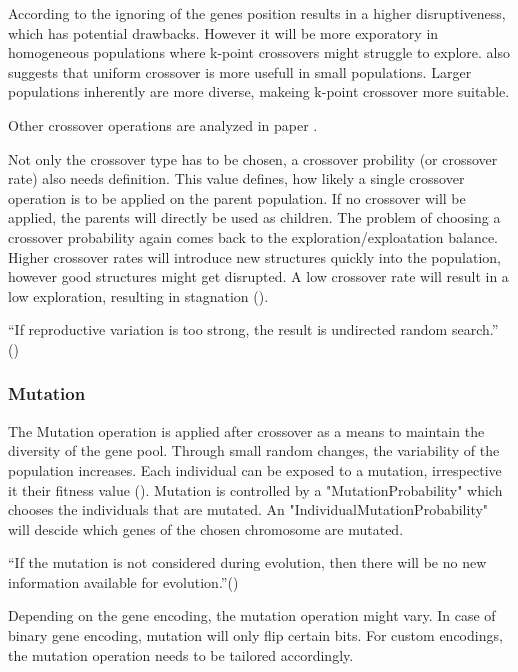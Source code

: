 According to \cite{srinivas_genetic_1994} the ignoring of the genes position results in a higher disruptiveness, which has potential drawbacks. However it will be more exporatory in homogeneous populations where k-point crossovers might struggle to explore. \cite{srinivas_genetic_1994} also suggests that uniform crossover is more usefull in small populations. Larger populations inherently are more diverse, makeing k-point crossover more suitable.

Other crossover operations are analyzed in paper . 

Not only the crossover type has to be chosen, a crossover probility (or crossover rate) also needs definition. This value defines, how likely a single crossover operation is to be applied on the parent population. If no crossover will be applied, the parents will directly be used as children.
The problem of choosing a crossover probability again comes back to the exploration/exploatation balance. Higher crossover rates will introduce new structures quickly into the population, however good structures might get disrupted. A low crossover rate will result in a low exploration, resulting in stagnation (\cite{grefenstette_optimization_1986}). 

\enquote{If reproductive variation is too strong, the result is undirected random search.} (\cite{kacprzyk_parameter_2007})

\subsubsection{Mutation}
The Mutation operation is applied after crossover as a means to maintain the diversity of the gene pool. Through small random changes, the variability of the population increases. Each individual can be exposed to a mutation, irrespective it their fitness value (\cite{srinivas_genetic_1994}).
Mutation is controlled by a "MutationProbability" which chooses the individuals that are mutated. An "IndividualMutationProbability" will descide which genes of the chosen chromosome are mutated.

\enquote{If the mutation is not considered during evolution, then there will be no new information available for evolution.}(\cite{katoch_review_2021})

Depending on the gene encoding, the mutation operation might vary. In case of binary gene encoding, mutation will only flip certain bits. For custom encodings, the mutation operation needs to be tailored accordingly.

